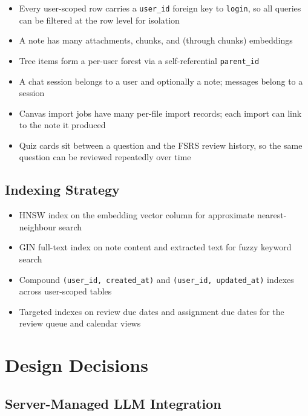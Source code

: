 \documentclass[12pt,a4paper]{article}
\begin{document}
\begin{itemize}
    \item Every user-scoped row carries a \texttt{user\_id} foreign key to \texttt{login}, so all queries can be filtered at the row level for isolation
    \item A note has many attachments, chunks, and (through chunks) embeddings
    \item Tree items form a per-user forest via a self-referential \texttt{parent\_id}
    \item A chat session belongs to a user and optionally a note; messages belong to a session
    \item Canvas import jobs have many per-file import records; each import can link to the note it produced
    \item Quiz cards sit between a question and the FSRS review history, so the same question can be reviewed repeatedly over time
\end{itemize}

\subsection{Indexing Strategy}

\begin{itemize}
    \item HNSW index on the embedding vector column for approximate nearest-neighbour search
    \item GIN full-text index on note content and extracted text for fuzzy keyword search
    \item Compound \texttt{(user\_id, created\_at)} and \texttt{(user\_id, updated\_at)} indexes across user-scoped tables
    \item Targeted indexes on review due dates and assignment due dates for the review queue and calendar views
\end{itemize}

\section{Design Decisions}

\subsection{Server-Managed LLM Integration}
\end{document}
